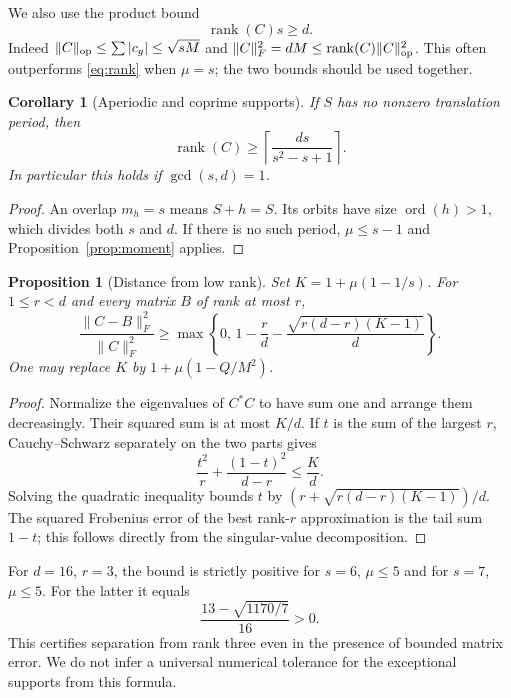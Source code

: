 \documentclass[11pt,a4paper]{article}
\newtheorem{corollary}[theorem]{Corollary}
\newtheorem{proposition}[theorem]{Proposition}
\theoremstyle{remark}\newtheorem{remark}[theorem]{Remark}
\DeclareMathOperator{\rank}{rank}
\DeclareMathOperator{\ord}{ord}
\newcommand{\ceil}[1]{\left\lceil #1\right\rceil}
\begin{document}
We also use the product bound
\begin{equation}\label{eq:product}
 \rank(C)s\ge d.
\end{equation}
Indeed $\|C\|_{\rm op}\le\sum|c_g|\le\sqrt{sM}$ and $\|C\|_F^2=dM\le\rank(C)\|C\|_{\rm op}^2$. This often outperforms \eqref{eq:rank} when $\mu=s$; the two bounds should be used together.

\begin{corollary}[Aperiodic and coprime supports]\label{cor:coprime}
If $S$ has no nonzero translation period, then
\[
 \rank(C)\ge\ceil{\frac{ds}{s^2-s+1}}.
\]
In particular this holds if $\gcd(s,d)=1$.
\end{corollary}
\begin{proof}
An overlap $m_h=s$ means $S+h=S$. Its orbits have size $\ord(h)>1$, which divides both $s$ and $d$. If there is no such period, $\mu\le s-1$ and Proposition~\ref{prop:moment} applies.
\end{proof}

\begin{proposition}[Distance from low rank]\label{prop:distance}
Set $K=1+\mu(1-1/s)$. For $1\le r<d$ and every matrix $B$ of rank at most $r$,
\begin{equation}\label{eq:distance}
 \frac{\|C-B\|_F^2}{\|C\|_F^2}
 \ge \max\left\{0,\,1-\frac rd-\frac{\sqrt{r(d-r)(K-1)}}d\right\}.
\end{equation}
One may replace $K$ by $1+\mu(1-Q/M^2)$.
\end{proposition}
\begin{proof}
Normalize the eigenvalues of $C^*C$ to have sum one and arrange them decreasingly. Their squared sum is at most $K/d$. If $t$ is the sum of the largest $r$, Cauchy--Schwarz separately on the two parts gives
\[
 \frac{t^2}{r}+\frac{(1-t)^2}{d-r}\le\frac Kd.
\]
Solving the quadratic inequality bounds $t$ by $(r+\sqrt{r(d-r)(K-1)})/d$. The squared Frobenius error of the best rank-$r$ approximation is the tail sum $1-t$; this follows directly from the singular-value decomposition.
\end{proof}

For $d=16$, $r=3$, the bound is strictly positive for $s=6$, $\mu\le5$ and for $s=7$, $\mu\le5$. For the latter it equals
\[
 \frac{13-\sqrt{1170/7}}{16}>0.
\]
This certifies separation from rank three even in the presence of bounded matrix error. We do not infer a universal numerical tolerance for the exceptional supports from this formula.
\end{document}
